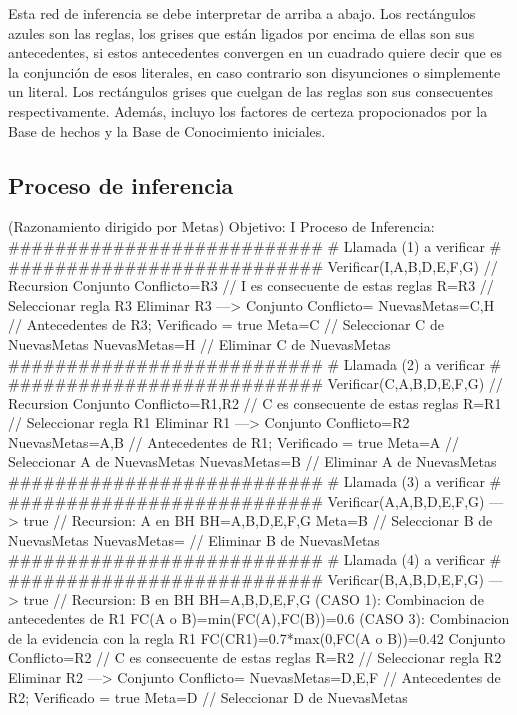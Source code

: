 \par Esta red de inferencia se debe interpretar de arriba a abajo.
Los rectángulos azules son las reglas, los grises que están ligados por encima 
de ellas son sus antecedentes, si estos antecedentes convergen en un cuadrado 
quiere decir que es la conjunción de esos literales, en caso contrario son disyunciones
o simplemente un literal. Los rectángulos grises que cuelgan de las reglas 
son sus consecuentes respectivamente. Además, incluyo los factores de certeza propocionados por
la Base de hechos y la Base de Conocimiento iniciales.

\subsection{Proceso de inferencia}
\begin{listing}[language=Pascal]
(Razonamiento dirigido por Metas)
Objetivo: I
Proceso de Inferencia: 
  ###########################
  # Llamada (1) a verificar #
  ###########################
	Verificar(I,{A,B,D,E,F,G}) // Recursion 
	Conjunto Conflicto={R3} // I es consecuente de estas reglas
	R={R3} // Seleccionar regla R3
	Eliminar R3 ---> Conjunto Conflicto={}
	NuevasMetas={C,H} // Antecedentes de R3; Verificado = true
	Meta=C // Seleccionar C de NuevasMetas
	NuevasMetas={H} // Eliminar C de NuevasMetas
  ###########################
  # Llamada (2) a verificar #
  ###########################
	Verificar(C,{A,B,D,E,F,G}) // Recursion 
	Conjunto Conflicto={R1,R2} // C es consecuente de estas reglas
	R={R1} // Seleccionar regla R1
	Eliminar R1 ---> Conjunto Conflicto={R2}
	NuevasMetas={A,B} // Antecedentes de R1; Verificado = true
	Meta=A // Seleccionar A de NuevasMetas
	NuevasMetas={B} // Eliminar A de NuevasMetas
  ###########################
  # Llamada (3) a verificar #
  ###########################
	Verificar(A,{A,B,D,E,F,G}) ---> true // Recursion: A en BH
	BH={A,B,D,E,F,G}
	Meta=B // Seleccionar B de NuevasMetas
	NuevasMetas={} // Eliminar B de NuevasMetas
  ###########################
  # Llamada (4) a verificar #
  ###########################
	Verificar(B,{A,B,D,E,F,G}) ---> true // Recursion: B en BH
	BH={A,B,D,E,F,G}
	(CASO 1): Combinacion de antecedentes de R1
	 FC(A o B)=min(FC(A),FC(B))=0.6
	(CASO 3): Combinacion de la evidencia con la regla R1
	 FC(C{R1})=0.7*max(0,FC(A o B))=0.42
	Conjunto Conflicto={R2} // C es consecuente de estas reglas
	R={R2} // Seleccionar regla R2
	Eliminar R2 ---> Conjunto Conflicto={}
	NuevasMetas={D,E,F} // Antecedentes de R2; Verificado = true
	Meta=D // Seleccionar D de NuevasMetas

\end{listing}
